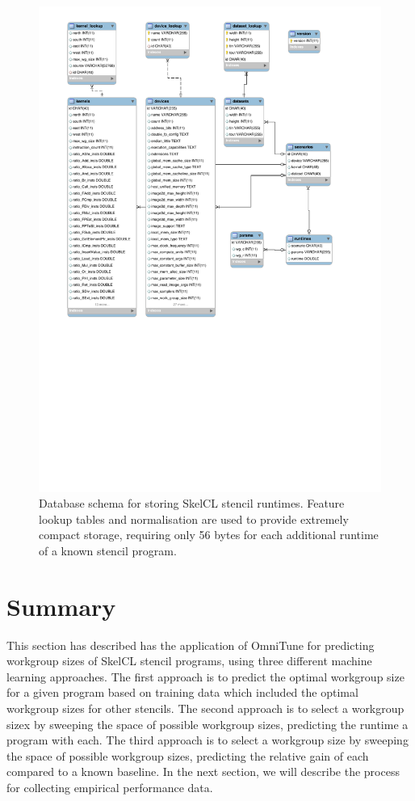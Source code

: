 \begin{figure}
\centering
\includegraphics[width=.95\textwidth]{img/omnitune-data-schema.pdf}
\caption[Database schema for storing performance results]{%
  Database schema for storing SkelCL stencil runtimes. Feature lookup
  tables and normalisation are used to provide extremely compact
  storage, requiring only 56 bytes for each additional runtime of a
  known stencil program.%
}
\label{fig:omnitune-system-flow}
\end{figure}


\section{Summary}

This section has described has the application of OmniTune for
predicting workgroup sizes of SkelCL stencil programs, using three
different machine learning approaches. The first approach is to
predict the optimal workgroup size for a given program based on
training data which included the optimal workgroup sizes for other
stencils. The second approach is to select a workgroup sizex by
sweeping the space of possible workgroup sizes, predicting the runtime
a program with each. The third approach is to select a workgroup size
by sweeping the space of possible workgroup sizes, predicting the
relative gain of each compared to a known baseline. In the next
section, we will describe the process for collecting empirical
performance data.
